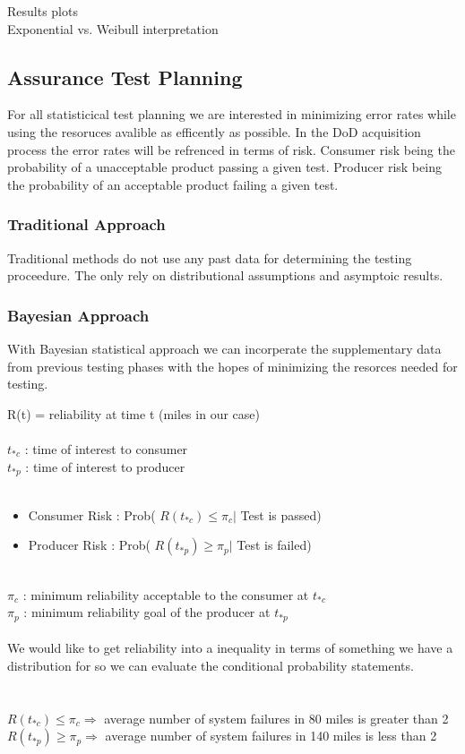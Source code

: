 \documentclass[12pt]{article}
\begin{document}
Results plots \\
Exponential vs. Weibull interpretation

\subsection{Assurance Test Planning}
For all statisticical test planning we are interested in minimizing error rates
while using the resoruces avalible as efficently as possible.  In the DoD
acquisition process the error rates will be refrenced in terms of risk.
Consumer risk being the probability of a unacceptable product passing a given
test.  Producer risk being the probability of an acceptable product failing a
given test.

\subsubsection{Traditional Approach}
Traditional methods do not use any past data for determining the testing
proceedure.  The only rely on distributional assumptions and asymptoic results.

\subsubsection{Bayesian Approach}

With Bayesian statistical approach we can incorperate the supplementary data
from previous testing phases with the hopes of minimizing the resorces needed
for testing.

R(t) = reliability at time t (miles in our case)
\\
\\$ t_{*c} $ : time of interest to consumer
\\$ t_{*p} $ : time of interest to producer
\\
\\
\begin{itemize}
\item Consumer Risk :   Prob( $ R(t_{*c}) \leq \pi_c \vert $ Test is passed)
\item Producer Risk :   Prob( $ R(t_{*p}) \geq \pi_p \vert $ Test is failed)
\end{itemize}
\
\\$ \pi_c $ : minimum reliability acceptable to the consumer at $ t_{*c} $
\\$ \pi_p $ : minimum reliability goal of the producer at $ t_{*p} $
\\
\\
We would like to get reliability into a inequality in terms of something we have
a distribution for so we can evaluate the conditional probability statements.
\\
\\
\\$ R(t_{*c}) \leq \pi_c \Rightarrow $ average number of system failures in 80
miles is greater than 2
\\$ R(t_{*p}) \geq \pi_p \Rightarrow $ average number of system failures in 140
miles is less than 2
\end{document}
